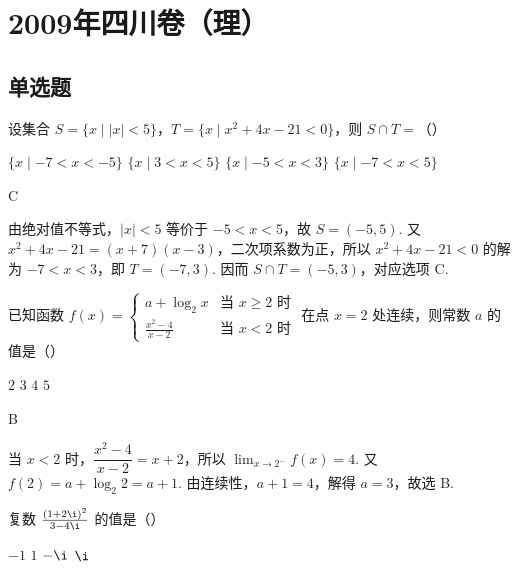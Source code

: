 \chapter{2009年四川卷（理）}

\section{单选题}

\begin{problem}
设集合 \(S = \{x \mid |x| < 5\}\)，\(T = \{x \mid x^2 + 4x - 21 < 0\}\)，则 \(S \cap T =\)（\quad）

\choices
    {\(\{x\mid -7 < x < -5\}\)}
    {\(\{x\mid 3 < x < 5\}\)}
    {\(\{x\mid -5 < x < 3\}\)}
    {\(\{x\mid -7 < x < 5\}\)}
\end{problem}

\begin{answer}
C
\end{answer}

\begin{solution}
由绝对值不等式，\(|x|<5\) 等价于 \(-5<x<5\)，故 \(S=(-5,5)\). 又 \(x^2+4x-21=(x+7)(x-3)\)，二次项系数为正，所以 \(x^2+4x-21<0\) 的解为 \(-7<x<3\)，即 \(T=(-7,3)\). 因而 \(S\cap T=(-5,3)\)，对应选项 C.
\end{solution}

\begin{problem}
已知函数 \(f(x) = \begin{cases}
a + \log_2 x & \text{当 } x \geqslant 2 \text{ 时}\\
\frac{x^2 - 4}{x - 2} & \text{当 } x < 2 \text{ 时}
\end{cases}\) 在点 \(x = 2\) 处连续，则常数 \(a\) 的值是（\quad）

\choices
    {\(2\)}
    {\(3\)}
    {\(4\)}
    {\(5\)}
\end{problem}

\begin{answer}
B
\end{answer}

\begin{solution}
当 \(x<2\) 时，\(\dfrac{x^2-4}{x-2}=x+2\)，所以 \(\displaystyle\lim_{x\to2^-}f(x)=4\). 又 \(f(2)=a+\log_2 2=a+1\). 由连续性，\(a+1=4\)，解得 \(a=3\)，故选 B.
\end{solution}

\begin{problem}
复数 \(\frac{(1 + 2\i)^2}{3 - 4\i}\) 的值是（\quad）

\choices
    {\(-1\)}
    {\(1\)}
    {\(-\i\)}
    {\(\i\)}
\end{problem}

